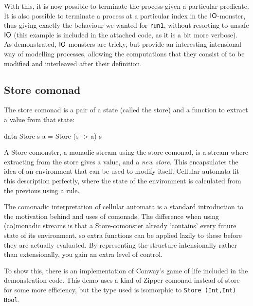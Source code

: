 With this, it is now possible to terminate the process given a particular predicate. It is also possible to terminate a process at a particular index in the $\mathsf{IO}$-monster, thus giving exactly the behaviour we wanted for \verb+run1+, without resorting to unsafe $\mathsf{IO}$ (this example is included in the attached code, as it is a bit more verbose). \\

As demonstrated, $\mathsf{IO}$-monsters are tricky, but provide an interesting intensional way of modelling processes, allowing the computations that they consist of to be modified and interleaved after their definition.
 
\subsection{Store comonad}

The store comonad is a pair of a state (called the store) and a function to extract a value from that state:

\begin{haskell}
data Store s a = Store (s -> a) s
\end{haskell}

A Store-comonster, a monadic stream using the store comonad, is a stream where extracting from the store gives a value, and a \emph{new store}. This encapsulates the idea of an environment that can be used to modify itself. Cellular automata fit this description perfectly, where the state of the environment is calculated from the previous using a rule. 

The comonadic interpretation of cellular automata is a standard introduction to the motivation behind and uses of comonads. The difference when using (co)monadic streams is that a Store-comonster already `contains' every future state of its environment, so extra functions can be applied lazily to these before they are actually evaluated. By representing the structure intensionally rather than extensionally, you gain an extra level of control.

To show this, there is an implementation of Conway's game of life included in the demonstration code. This demo uses a kind of Zipper comonad instead of store for some more efficiency, but the type used is isomorphic to \verb+Store (Int,Int) Bool+.
